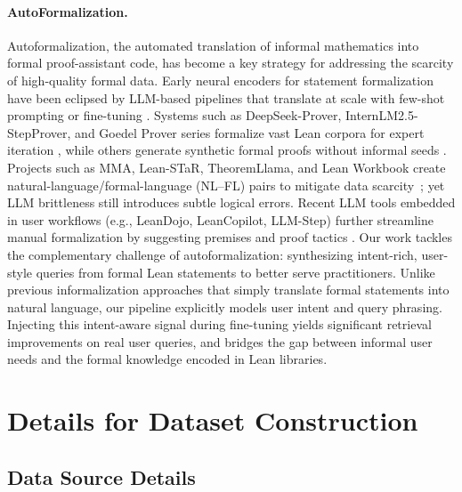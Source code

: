 \documentclass{article} %
\begin{document}
\paragraph{AutoFormalization.}
Autoformalization, the automated translation of informal mathematics into formal proof-assistant code, has become a key strategy for addressing the scarcity of high-quality formal data.
Early neural encoders for statement formalization \citep{wang2018first} have been eclipsed by LLM-based pipelines that translate at scale with few-shot prompting or fine-tuning \citep{wu2022autoformalization,wu2024internlm2,xin2024deepseek,xin2024deepseekv15}.
Systems such as DeepSeek-Prover,  InternLM2.5-StepProver, and Goedel Prover series formalize vast Lean corpora for expert iteration \citep{xin2024deepseek,wu2024internlm2, lin2025goedel, lin2025goedelproverv2scalingformaltheorem}, while others generate synthetic formal proofs without informal seeds \citep{wu2020int,wang2020learning,poesia2024learning}.
Projects such as MMA, Lean-STaR, TheoremLlama, and Lean Workbook create natural-language/formal-language (NL–FL) pairs to mitigate data scarcity~\citep{mma,leanstar,wang2024theoremllama,leanworkbook}; yet LLM brittleness still introduces subtle logical errors.
Recent LLM tools embedded in user workflows (e.g., LeanDojo, LeanCopilot, LLM-Step) further streamline manual formalization by suggesting premises and proof tactics \citep{yang2023leandojo,lean_copilot_song2024towards,llmstep_welleck2023llmstep, shen2025real}.
Our work tackles the complementary challenge of autoformalization: synthesizing intent-rich, user-style queries from formal Lean statements to better serve practitioners. Unlike previous informalization approaches that simply translate formal statements into natural language, our pipeline explicitly models user intent and query phrasing. Injecting this intent-aware signal during fine-tuning yields significant retrieval improvements on real user queries, and bridges the gap between informal user needs and the formal knowledge encoded in Lean libraries.


\section{Details for Dataset Construction}
\subsection{Data Source Details}
\label{data_source_details}
\end{document}
